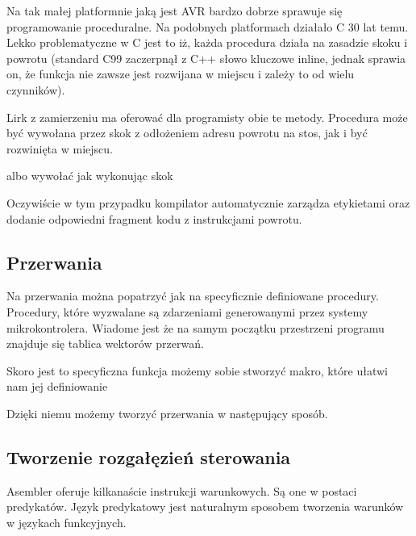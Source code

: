 \documentclass[11pt]{article}
\begin{document}
Na tak małej platformnie jaką jest AVR bardzo dobrze sprawuje się programowanie proceduralne. Na podobnych platformach działało C 30 lat temu. Lekko problematyczne w C jest to iż, każda procedura działa na zasadzie skoku i powrotu (standard C99 zaczerpnął z C++ słowo kluczowe inline, jednak sprawia on, że funkcja nie zawsze jest rozwijana w miejscu i zależy to od wielu czynników). 

Lirk z zamierzeniu ma oferować dla programisty obie te metody. Procedura może być wywołana przez skok z odłożeniem adresu powrotu na stos, jak i być rozwinięta w miejscu.
\newpage

\begin{multicols}{2}

\columnbreak

\end{multicols}
albo wywołać jak wykonując skok
\begin{multicols}{2}

\columnbreak

\end{multicols}

Oczywiście w tym przypadku kompilator automatycznie zarządza etykietami oraz dodanie odpowiedni fragment kodu z instrukcjami powrotu.

\subsection{Przerwania}

Na przerwania można popatrzyć jak na specyficznie definiowane procedury. Procedury, które wyzwalane są zdarzeniami generowanymi przez systemy mikrokontrolera.
Wiadome jest że na samym początku przestrzeni programu znajduje się tablica wektorów przerwań.

Skoro jest to specyficzna funkcja możemy sobie stworzyć makro, które ułatwi nam jej definiowanie




Dzięki niemu możemy tworzyć przerwania w następujący sposób.



\subsection{Tworzenie rozgałęzień sterowania}
Asembler oferuje kilkanaście instrukcji warunkowych. Są one w postaci predykatów. Język predykatowy jest naturalnym sposobem tworzenia warunków w językach funkcyjnych. 
\end{document}
